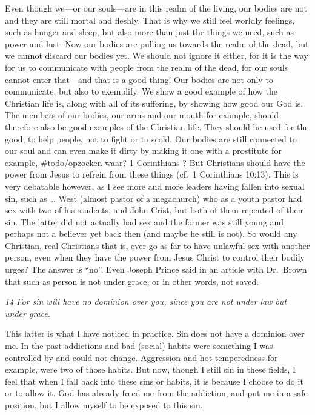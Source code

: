 Even though we---or our souls---are in this realm of the living, our
bodies are not and they are still mortal and fleshly. That is why we
still feel worldly feelings, such as hunger and sleep, but also more
than just the things we need, such as power and lust. Now our bodies are
pulling us towards the realm of the dead, but we cannot discard our
bodies yet. We should not ignore it either, for it is the way for us to
communicate with people from the realm of the dead, for our souls cannot
enter that---and that is a good thing! Our bodies are not only to
communicate, but also to exemplify. We show a good example of how the
Christian life is, along with all of its suffering, by showing how good
our God is. The members of our bodies, our arms and our mouth for
example, should therefore also be good examples of the Christian life.
They should be used for the good, to help people, not to fight or to
scold. Our bodies are still connected to our soul and can even make it
dirty by making it one with a prostitute for example, \#todo/opzoeken
waar? 1 Corinthians ? But Christians should have the power from Jesus to
refrein from these things (cf.~1 Corinthians 10:13). This is very
debatable however, as I see more and more leaders having fallen into
sexual sin, such as \ldots{} West (almost pastor of a megachurch) who as
a youth pastor had sex with two of his students, and John Crist, but
both of them repented of their sin. The latter did not actually had sex
and the former was still young and perhaps not a believer yet back then
(and maybe he still is not). So would any Christian, real Christians
that is, ever go as far to have unlawful sex with another person, even
when they have the power from Jesus Christ to control their bodily
urges? The answer is ``no''. Even Joseph Prince said in an article with
Dr.~Brown that such as person is not under grace, or in other words, not
saved.

\emph{14 For sin will have no dominion over you, since you are not under
law but under grace.}

This latter is what I have noticed in practice. Sin does not have a
dominion over me. In the past addictions and bad (social) habits were
something I was controlled by and could not change. Aggression and
hot-temperedness for example, were two of those habits. But now, though
I still sin in these fields, I feel that when I fall back into these
sins or habits, it is because I choose to do it or to allow it. God has
already freed me from the addiction, and put me in a safe position, but
I allow myself to be exposed to this sin.

